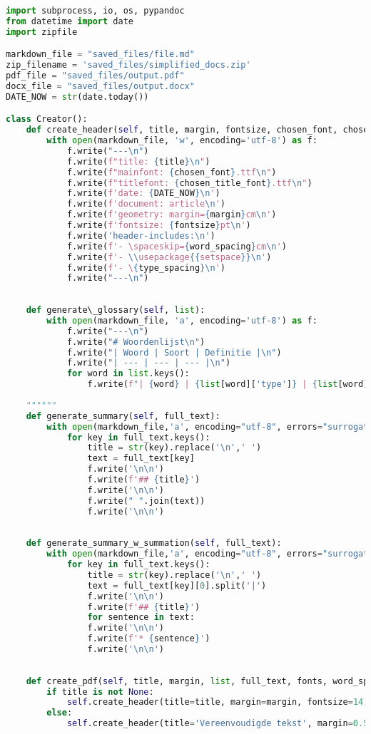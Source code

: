 \begin{lstlisting}[language=Python, caption={Writer-klasse omvattende de code om dynamische PDF- en Word-documenten te genereren.}, label={code:writer-klasse}]
import subprocess, io, os, pypandoc
from datetime import date
import zipfile

markdown_file = "saved_files/file.md"
zip_filename = 'saved_files/simplified_docs.zip'
pdf_file = "saved_files/output.pdf"
docx_file = "saved_files/output.docx"
DATE_NOW = str(date.today())

class Creator():
	def create_header(self, title, margin, fontsize, chosen_font, chosen_title_font, word_spacing, type_spacing):
		with open(markdown_file, 'w', encoding='utf-8') as f:
			f.write("---\n")
			f.write(f"title: {title}\n") 
			f.write(f"mainfont: {chosen_font}.ttf\n")
			f.write(f"titlefont: {chosen_title_font}.ttf\n")
			f.write(f'date: {DATE_NOW}\n')
			f.write(f'document: article\n')
			f.write(f'geometry: margin={margin}cm\n')
			f.write(f'fontsize: {fontsize}pt\n')
			f.write('header-includes:\n')
			f.write(f'- \spaceskip={word_spacing}cm\n')
			f.write(f'- \\usepackage{{setspace}}\n')
			f.write(f'- \{type_spacing}\n')
			f.write("---\n")
	
	
	def generate\_glossary(self, list):
		with open(markdown_file, 'a', encoding='utf-8') as f:
			f.write("---\n")
			f.write("# Woordenlijst\n")
			f.write("| Woord | Soort | Definitie |\n")
			f.write("| --- | --- | --- |\n")
			for word in list.keys(): 
				f.write(f"| {word} | {list[word]['type']} | {list[word]['definition']} |\n")
	
	""""""
	def generate_summary(self, full_text):
		with open(markdown_file,'a', encoding="utf-8", errors="surrogateescape") as f:
			for key in full_text.keys():
				title = str(key).replace('\n',' ')
				text = full_text[key]
				f.write('\n\n')
				f.write(f'## {title}')
				f.write('\n\n')
				f.write(" ".join(text))
				f.write('\n\n')
	
	
	def generate_summary_w_summation(self, full_text):
		with open(markdown_file,'a', encoding="utf-8", errors="surrogateescape") as f:
			for key in full_text.keys():
				title = str(key).replace('\n',' ')
				text = full_text[key][0].split('|')
				f.write('\n\n')
				f.write(f'## {title}')
				for sentence in text:    
				f.write('\n\n')
				f.write(f'* {sentence}')
				f.write('\n\n')
	
	
	def create_pdf(self, title, margin, list, full_text, fonts, word_spacing, type_spacing, summation):
		if title is not None:
			self.create_header(title=title, margin=margin, fontsize=14, chosen_font=fonts[0], chosen_title_font=fonts[1], word_spacing=word_spacing, type_spacing=type_spacing)
		else:
			self.create_header(title='Vereenvoudigde tekst', margin=0.5, fontsize=14, chosen_font=fonts[0], chosen_title_font=fonts[1], word_spacing=word_spacing, type_spacing=type_spacing)
	

\end{lstlisting}
